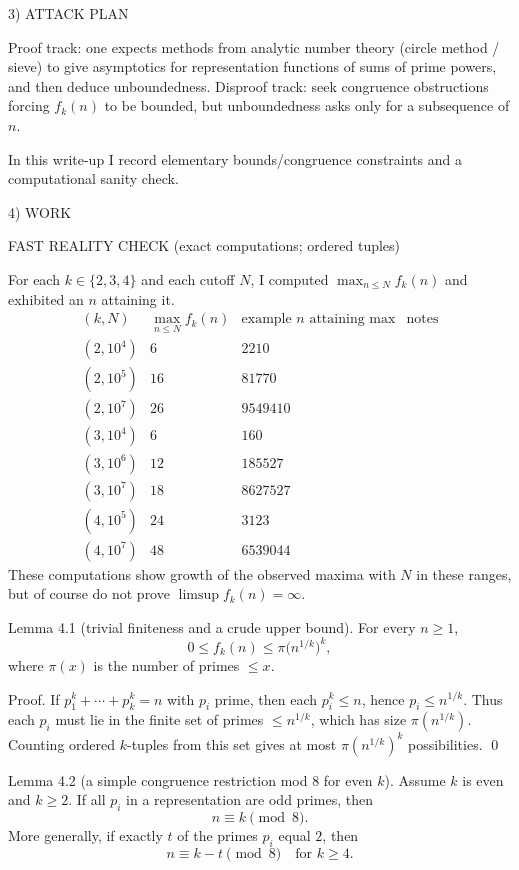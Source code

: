 3) ATTACK PLAN

Proof track: one expects methods from analytic number theory (circle method / sieve) to give asymptotics for representation functions of sums of prime powers, and then deduce unboundedness.
Disproof track: seek congruence obstructions forcing $f_k(n)$ to be bounded, but unboundedness asks only for a subsequence of $n$.

In this write-up I record elementary bounds/congruence constraints and a computational sanity check.

4) WORK

FAST REALITY CHECK (exact computations; ordered tuples)

For each $k\in\{2,3,4\}$ and each cutoff $N$, I computed $\max_{n\le N} f_k(n)$ and exhibited an $n$ attaining it.
\[
\begin{array}{c|c|c|c}
(k,N) & \max_{n\le N} f_k(n) & \text{example }n\text{ attaining max} & \text{notes}\\\hline
(2,10^4) & 6 & 2210 & \\
(2,10^5) & 16 & 81770 & \\
(2,10^7) & 26 & 9549410 & \\
(3,10^4) & 6 & 160 & \\
(3,10^6) & 12 & 185527 & \\
(3,10^7) & 18 & 8627527 & \\
(4,10^5) & 24 & 3123 & \\
(4,10^7) & 48 & 6539044 &
\end{array}
\]
These computations show growth of the observed maxima with $N$ in these ranges, but of course do not prove $\limsup f_k(n)=\infty$.

Lemma 4.1 (trivial finiteness and a crude upper bound).
For every $n\ge 1$,
\[
0\le f_k(n)\le \pi\bigl(n^{1/k}\bigr)^k,
\]
where $\pi(x)$ is the number of primes $\le x$.

Proof.
If $p_1^k+\cdots+p_k^k=n$ with $p_i$ prime, then each $p_i^k\le n$, hence $p_i\le n^{1/k}$.
Thus each $p_i$ must lie in the finite set of primes $\le n^{1/k}$, which has size $\pi(n^{1/k})$.
Counting ordered $k$-tuples from this set gives at most $\pi(n^{1/k})^k$ possibilities. \qed

Lemma 4.2 (a simple congruence restriction mod $8$ for even $k$).
Assume $k$ is even and $k\ge 2$. If all $p_i$ in a representation are odd primes, then
\[
n\equiv k\pmod 8.
\]
More generally, if exactly $t$ of the primes $p_i$ equal $2$, then
\[
n\equiv k-t\pmod 8\quad\text{for }k\ge 4.
\]

